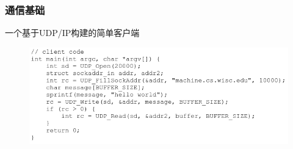 \begin{frame}[fragile]
    \frametitle{通信基础}
一个基于UDP/IP构建的简单客户端
            \begin{figure}
    \includegraphics[width=1.\linewidth]{figs/udp-client.png}
\end{figure}
\end{frame}

